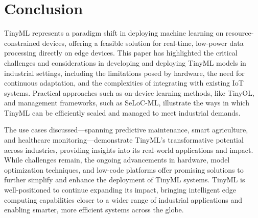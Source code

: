\documentclass[twocolumn]{article}
\begin{document}
\section{Conclusion}
\label{conclusion}

TinyML represents a paradigm shift in deploying machine learning on resource-constrained devices, offering a feasible solution for real-time, low-power data processing directly on edge devices. This paper has highlighted the critical challenges and considerations in developing and deploying TinyML models in industrial settings, including the limitations posed by hardware, the need for continuous adaptation, and the complexities of integrating with existing IoT systems. Practical approaches such as on-device learning methods, like TinyOL, and management frameworks, such as SeLoC-ML, illustrate the ways in which TinyML can be efficiently scaled and managed to meet industrial demands.

The use cases discussed—spanning predictive maintenance, smart agriculture, and healthcare monitoring—demonstrate TinyML's transformative potential across industries, providing insights into its real-world applications and impact. While challenges remain, the ongoing advancements in hardware, model optimization techniques, and low-code platforms offer promising solutions to further simplify and enhance the deployment of TinyML systems. TinyML is well-positioned to continue expanding its impact, bringing intelligent edge computing capabilities closer to a wider range of industrial applications and enabling smarter, more efficient systems across the globe.





\end{document}
